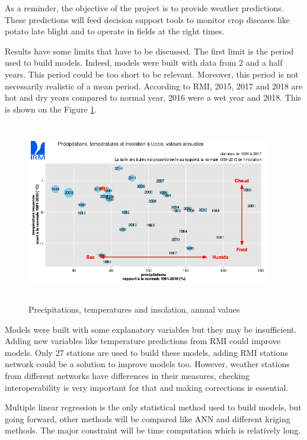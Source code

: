 \documentclass[12pt,twoside]{reedthesis}
\theoremstyle{definition}
\theoremstyle{definition}
\theoremstyle{definition}
\theoremstyle{remark}
\begin{document}
As a reminder, the objective of the project is to provide weather
predictions. These predictions will feed decision support tools to
monitor crop diseases like potato late blight and to operate in fields
at the right times.

Results have some limits that have to be discussed. The first limit is
the period used to build models. Indeed, models were built with data
from 2 and a half years. This period could be too short to be relevant.
Moreover, this period is not necessarily realistic of a mean period.
According to RMI, 2015, 2017 and 2018 are hot and dry years compared to
normal year, 2016 were a wet year and 2018. This is shown on the Figure
\ref{fig:rmi}.
\begin{figure}

{\centering \includegraphics[width=400px,height=300px]{figure/rmi_climate_data} 

}

\caption{Precipitations, temperatures and insolation, annual values}\label{fig:rmi}
\end{figure}
Models were built with some explanatory variables but they may be
insufficient. Adding new variables like temperature predictions from RMI
could improve models. Only 27 stations are used to build these models,
adding RMI stations network could be a solution to improve models too.
However, weather stations from different networks have differences in
their measures, checking interoperability is very important for that and
making corrections is essential.

Multiple linear regression is the only statistical method used to build
models, but going forward, other methods will be compared like ANN and
different kriging methods. The major constraint will be time computation
which is relatively long.
\end{document}
